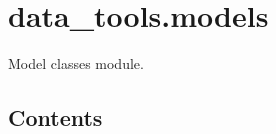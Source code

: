 \documentclass[letterpaper,10pt,english]{sphinxmanual}
\begin{document}
\begin{fulllineitems}
\begin{itemize}
\begin{description}
\end{description}

\end{itemize}

\end{fulllineitems}

\label{\detokenize{models:module-data_tools.models}}

\section{data\_tools.models}
\label{\detokenize{models:data-tools-models}}\label{\detokenize{models::doc}}
Model classes module.


\subsection{Contents}
\label{\detokenize{models:contents}}
\end{document}
